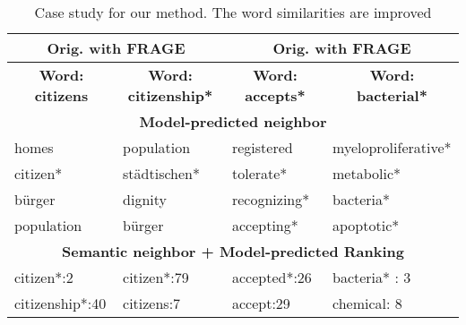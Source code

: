 \documentclass{article}
\begin{document}
\begin{table}[!ht]
\begin{center}
		\begin{tabular}{|p{2.5cm}|p{2.5cm}||p{2.5cm}|p{2.5cm}|}
			\toprule
			\multicolumn{2}{|c||}{\bf Orig. with FRAGE} & \multicolumn{2}{c|}{\bf Orig. with FRAGE}\\
            \hline
            \cline{1-4}
			\multicolumn{1}{|c|}{\bf Word: citizens} & \multicolumn{1}{|c||}{\bf Word: citizenship*} & \multicolumn{1}{c|}{\bf Word: accepts*} & \multicolumn{1}{c|}{\bf Word: bacterial*}\\
            \hline
            \cline{1-4}
            \multicolumn{4}{|c|}{\bf Model-predicted neighbor} \\
            \cline{1-4}
            homes & \small population  & registered  & \small myeloproliferative*\\
            citizen*  & \small städtischen*  & tolerate*  & metabolic*\\
            bürger  & dignity & recognizing*  & bacteria*  \\
            population & bürger  & accepting*  & \small apoptotic* \\
            \cline{1-4}
			\multicolumn{4}{|c|}{\bf Semantic neighbor + Model-predicted Ranking}\\
            \cline{1-4}
			citizen*:2 & citizen*:79 & accepted*:26 & bacteria* : 3\\
            citizenship*:40 & citizens:7 & accept:29 & chemical: 8\\
            \bottomrule
		\end{tabular}
	\end{center}
	\caption{\label{Compare-supp-table} Case study for our method. The word similarities are improved}
\end{table}
\end{document}
